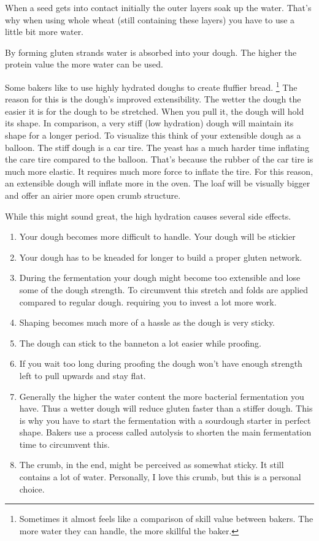 When a seed gets into contact initially the outer layers soak up the water.
That's why when using whole wheat (still containing these layers) you have to
use a little bit more water.

By forming gluten strands water is absorbed into your dough. The higher the
protein value the more water can be used.

Some bakers like to use highly hydrated doughs to create fluffier bread.
\footnote{Sometimes it almost feels like a comparison of skill value between bakers. The
more water they can handle, the more skillful the baker.} The reason for this
is the dough's improved extensibility. The wetter the dough the easier it is
for the dough to be stretched. When you pull it, the dough will hold its
shape. In comparison, a very stiff (low hydration) dough will maintain its
shape for a longer period. To visualize this think of your extensible
dough as a balloon. The stiff dough is a car tire. The yeast has a much harder
time inflating the care tire compared to the balloon. That's because the
rubber of the car tire is much more elastic. It requires much more force to
inflate the tire. For this reason, an extensible dough will inflate more in the
oven. The loaf will be visually bigger and offer an airier more open crumb structure.

While this might sound great, the high hydration causes several side effects.

\begin{enumerate}
  \item Your dough becomes more difficult to handle. Your dough will be stickier
  \item Your dough has to be kneaded for longer to build a proper gluten
    network.
  \item During the fermentation your dough might become too extensible and lose
    some of the dough strength. To circumvent this stretch and folds are applied
    compared to regular dough.
    requiring you to invest a lot more work.
  \item Shaping becomes much more of a hassle as the dough is very sticky.
  \item The dough can stick to the banneton a lot easier while proofing.
  \item If you wait too long during proofing the dough won't have enough strength
    left to pull upwards and stay flat.
  \item Generally the higher the water content the more bacterial fermentation you
    have. Thus a wetter dough will reduce gluten faster than a stiffer dough.
    This is why you have to start the fermentation with a sourdough starter in
    perfect shape. Bakers use a process called autolysis to shorten the main
    fermentation time to circumvent this.
  \item The crumb, in the end, might be perceived as somewhat sticky. It still
    contains a lot of water. Personally, I love this crumb, but this is a personal
    choice.
\end{enumerate}

